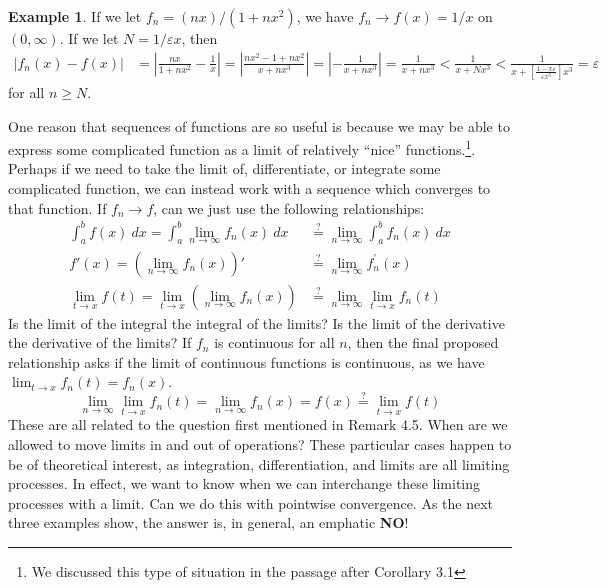 \documentclass{article}
\theoremstyle{definition}
\newtheorem{example}{Example}[section]
\begin{document}
	\begin{example}
		If we let $ f_n=(nx)/(1+nx^2) $, we have $ f_n\to f(x)=1/x $ on $ (0,\infty) $. 
		If we let $ N=1/\varepsilon x $, then \begin{align*}
			|f_n(x)-f(x)|&=\left\lvert\frac{nx}{1+nx^2}-\frac{1}{x}\right\rvert=\left\lvert\frac{nx^2-1+nx^2}{x+nx^3}\right\rvert=\left\lvert-\frac{1}{x+nx^3}\right\rvert=\frac{1}{x+nx^3}<\frac{1}{x+Nx^3}<\frac{1}{x+\left[\frac{1-x\varepsilon}{\varepsilon x^3}\right]x^3}=\varepsilon
		\end{align*} for all $ n\ge N $. 
	\end{example}
	One reason that sequences of functions are so useful is because we may be able to express some complicated function as a limit of relatively ``nice'' functions.\footnote{We discussed this type of situation in the passage after Corollary 3.1}. Perhaps if we need to take the limit of, differentiate, or integrate some complicated function, we can instead work with a sequence which converges to that function. If $ f_n\to f $, can we just use the following relationships:
	\begin{align*}
		\int_{a}^{b}f(x)\ dx=\int_{a}^{b}\lim\limits_{n\to\infty}f_n(x)\ dx&\stackrel{?}{=}\lim\limits_{n\to\infty}\int_{a}^{b}f_n(x)\ dx\\
		f'(x)=\left(\lim\limits_{n\to\infty}f_n(x)\right)'&\stackrel{?}{=}\lim\limits_{n\to\infty}f_n^\prime(x)\\
		\lim\limits_{t\to x}f(t)= \lim\limits_{t\to x }\left(\lim\limits_{n\to\infty}f_n(x)\right)&\stackrel{?}{=}\lim\limits_{n\to\infty}\lim\limits_{t\to x}f_n(t)
	\end{align*}
	Is the limit of the integral the integral of the limits? Is the limit of the derivative the derivative of the limits? If $ f_n $ is continuous for all $ n $, then the final proposed relationship asks if the limit of continuous functions is continuous, as we have $ \lim_{t\to x}f_n(t)=f_n(x) $. $$	\lim\limits_{n\to\infty}\lim\limits_{t\to x}f_n(t)=\lim\limits_{n\to \infty }f_n(x)=f(x)\stackrel{?}{=}\lim_{t\to x} f(t) $$
	These are all related to the question first mentioned in Remark 4.5. When are we allowed to move limits in and out of operations? These particular cases happen to be of theoretical interest, as integration, differentiation, and limits are all limiting processes. In effect, we want to know when we can interchange these limiting processes with a limit. Can we do this with pointwise convergence. As the next three examples show, the answer is, in general, an emphatic \textbf{NO}!
\end{document}
